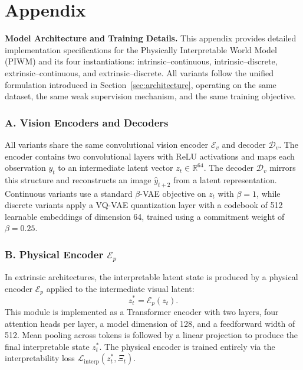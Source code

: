\documentclass[nonacm,sigconf]{acmart}
\begin{document}

\newpage




\clearpage

\newpage

\appendix
\section*{Appendix}

\textbf{Model Architecture and Training Details.} This appendix provides detailed implementation specifications for the Physically
Interpretable World Model (PIWM) and its four instantiations:
intrinsic--continuous, intrinsic--discrete, extrinsic--continuous, and
extrinsic--discrete. All variants follow the unified formulation introduced in
Section~\ref{sec:architecture}, operating on the same dataset, the same weak
supervision mechanism, and the same training objective.

\subsubsection*{A. Vision Encoders and Decoders}

All variants share the same convolutional vision encoder $\mathcal{E}_v$ and
decoder $\mathcal{D}_v$. The encoder contains two convolutional layers with ReLU
activations and maps each observation $y_t$ to an intermediate latent vector
$z_t \in \mathbb{R}^{64}$. The decoder $\mathcal{D}_v$ mirrors this structure
and reconstructs an image $\hat{y}_{t+2}$ from a latent representation.  
Continuous variants use a standard $\beta$-VAE objective on $z_t$ with
$\beta = 1$, while discrete variants apply a VQ-VAE quantization layer with a
codebook of 512 learnable embeddings of dimension 64, trained using a
commitment weight of $\beta = 0.25$.

\subsubsection*{B. Physical Encoder $\mathcal{E}_p$}

In extrinsic architectures, the interpretable latent state is produced by a
physical encoder $\mathcal{E}_p$ applied to the intermediate visual latent:
\[
z^*_t = \mathcal{E}_p(z_t).
\]
This module is implemented as a Transformer encoder with two layers, four
attention heads per layer, a model dimension of 128, and a feedforward width of
512. Mean pooling across tokens is followed by a linear projection to produce
the final interpretable state $z^*_t$. The physical encoder is trained entirely
via the interpretability loss $\mathcal{L}_{\text{interp}}(z^*_t, \Xi_t)$.
\end{document}
